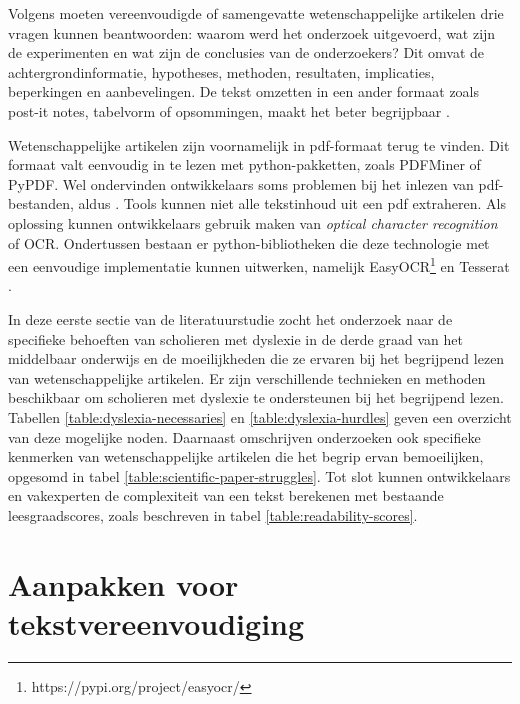 \medspace

Volgens \textcite{Hollenkamp2020, McCombes2022} moeten vereenvoudigde of samengevatte wetenschappelijke artikelen drie vragen kunnen beantwoorden: waarom werd het onderzoek uitgevoerd, wat zijn de experimenten en wat zijn de conclusies van de onderzoekers? Dit omvat de achtergrondinformatie, hypotheses, methoden, resultaten, implicaties, beperkingen en aanbevelingen. De tekst omzetten in een ander formaat zoals post-it notes, tabelvorm of opsommingen, maakt het beter begrijpbaar \autocite{Rijkhoff2022}. 

\medspace

Wetenschappelijke artikelen zijn voornamelijk in pdf-formaat terug te vinden. Dit formaat valt eenvoudig in te lezen met python-pakketten, zoals PDFMiner of PyPDF. Wel ondervinden ontwikkelaars soms problemen bij het inlezen van pdf-bestanden, aldus \textcite{Lee2021}. Tools kunnen niet alle tekstinhoud uit een pdf extraheren. Als oplossing kunnen ontwikkelaars gebruik maken van \textit{optical character recognition} of OCR. Ondertussen bestaan er python-bibliotheken die deze technologie met een eenvoudige implementatie kunnen uitwerken, namelijk EasyOCR\footnote{https://pypi.org/project/easyocr/} en Tesserat \autocite{Lee2021}.

\medspace

In deze eerste sectie van de literatuurstudie zocht het onderzoek naar de specifieke behoeften van scholieren met dyslexie in de derde graad van het middelbaar onderwijs en de moeilijkheden die ze ervaren bij het begrijpend lezen van wetenschappelijke artikelen. Er zijn verschillende technieken en methoden beschikbaar om scholieren met dyslexie te ondersteunen bij het begrijpend lezen. Tabellen \ref{table:dyslexia-necessaries} en \ref{table:dyslexia-hurdles} geven een overzicht van deze mogelijke noden. Daarnaast omschrijven onderzoeken ook specifieke kenmerken van wetenschappelijke artikelen die het begrip ervan bemoeilijken, opgesomd in tabel \ref{table:scientific-paper-struggles}. Tot slot kunnen ontwikkelaars en vakexperten de complexiteit van een tekst berekenen met bestaande leesgraadscores, zoals beschreven in tabel \ref{table:readability-scores}.

\section{Aanpakken voor tekstvereenvoudiging}

